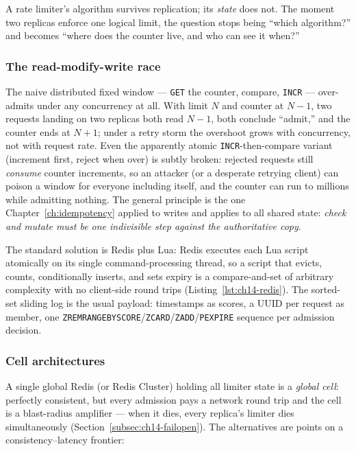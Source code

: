 A rate limiter's algorithm survives replication; its \emph{state} does not.
The moment two replicas enforce one logical limit, the question stops being
``which algorithm?'' and becomes ``where does the counter live, and who can
see it when?''

\subsubsection{The read-modify-write race}
The naive distributed fixed window --- \texttt{GET} the counter, compare,
\texttt{INCR} --- over-admits under any concurrency at all. With limit $N$
and counter at $N-1$, two requests landing on two replicas both read $N-1$,
both conclude ``admit,'' and the counter ends at $N+1$; under a retry storm
the overshoot grows with concurrency, not with request rate. Even the
apparently atomic \texttt{INCR}-then-compare variant (increment first,
reject when over) is subtly broken: rejected requests still \emph{consume}
counter increments, so an attacker (or a desperate retrying client) can
poison a window for everyone including itself, and the counter can run to
millions while admitting nothing. The general principle is the one
Chapter~\ref{ch:idempotency} applied to writes and
\cite{kleppmann2017ddia} applies to all shared state: \emph{check and
mutate must be one indivisible step against the authoritative copy}.

The standard solution is Redis plus Lua: Redis executes each Lua script
atomically on its single command-processing thread, so a script that
evicts, counts, conditionally inserts, and sets expiry is a compare-and-set
of arbitrary complexity with no client-side round trips
(Listing~\ref{lst:ch14-redis}). The sorted-set sliding log is the usual
payload: timestamps as scores, a UUID per request as member, one
\texttt{ZREMRANGEBYSCORE}/\texttt{ZCARD}/\texttt{ZADD}/\texttt{PEXPIRE}
sequence per admission decision.

\subsubsection{Cell architectures}
A single global Redis (or Redis Cluster) holding all limiter state is a
\emph{global cell}: perfectly consistent, but every admission pays a network
round trip and the cell is a blast-radius amplifier --- when it dies, every
replica's limiter dies simultaneously (Section~\ref{subsec:ch14-failopen}).
The alternatives are points on a consistency--latency frontier:


